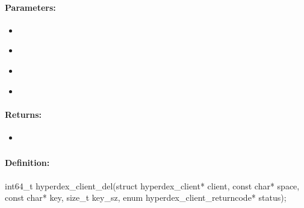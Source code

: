 \paragraph{Parameters:}
\begin{itemize}[noitemsep]
\item {}\\

\item {}\\

\item {}\\

\item {}\\

\end{itemize}

\paragraph{Returns:}
\begin{itemize}[noitemsep]
\item {}\\

\end{itemize}

\pagebreak
\subsubsection{}
\label{api:c:del}


\paragraph{Definition:}
\begin{ccode}
int64_t hyperdex_client_del(struct hyperdex_client* client,
        const char* space,
        const char* key, size_t key_sz,
        enum hyperdex_client_returncode* status);
\end{ccode}

